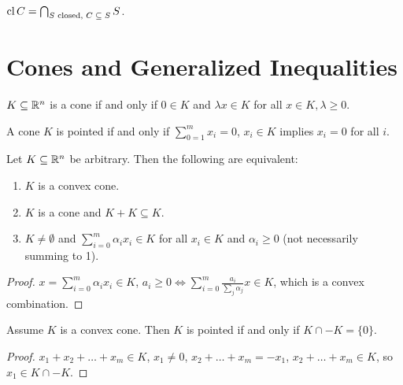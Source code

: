 \begin{thm}
  \label{sec:convexity-17}
  $\operatorname*{cl} C = \bigcap_{\text{$S$ closed, $C \subseteq S$}} S$.
\end{thm}

\section{Cones and Generalized Inequalities}
\label{sec:cones-gener-ineq}

\begin{defn}
  \label{sec:cones-gener-ineq-1}
  $K \subseteq \mathbb{R}^{n}$ is a cone if and only if $0 \in K$ and $\lambda
  x \in K$ for all $x \in K, \lambda \geq 0$.

  A cone $K$ is pointed if and only if $\sum_{0=1}^{m} x_{i} = 0$,
  $x_{i} \in K$ implies $x_{i} = 0$ for all $i$.
\end{defn}

\begin{thm}
  \label{sec:cones-gener-ineq-2}
  Let $K \subseteq \mathbb{R}^{n}$ be arbitrary. Then the following are equivalent:
  \begin{enumerate}
  \item $K$ is a convex cone.
  \item $K$ is a cone and $K + K \subseteq K$.
  \item $K \neq \emptyset$ and $\sum_{i=0}^{m} \alpha_{i} x_{i} \in K$
    for all $x_{i} \in K$ and $\alpha_{i} \geq 0$ (not necessarily
    summing to 1).
  \end{enumerate}
\end{thm}

\begin{proof}
  $x = \sum_{i=0}^{m} \alpha_{i} x_{i} \in K$, $a_{i} \geq 0 \iff
  \sum_{i=0}^{m} \frac{a_{i}}{\sum_{j}^{} \alpha_{j}} x \in K$, which
  is a convex combination.
\end{proof}

\begin{thm}
  \label{sec:cones-gener-ineq-4}
  Assume $K$ is a convex cone.  Then $K$ is pointed if and only if $K
  \cap -K = \{ 0 \} $.
\end{thm}

\begin{proof}
  $x_{1} + x_{2} + \dots + x_{m} \in K$, $x_{1} \neq 0$, $x_{2} +
  \dots + x_{m} = -x_{1}$, $x_{2} + \dots + x_{m} \in K$, so $x_{1}
  \in K \cap - K$.
\end{proof}

